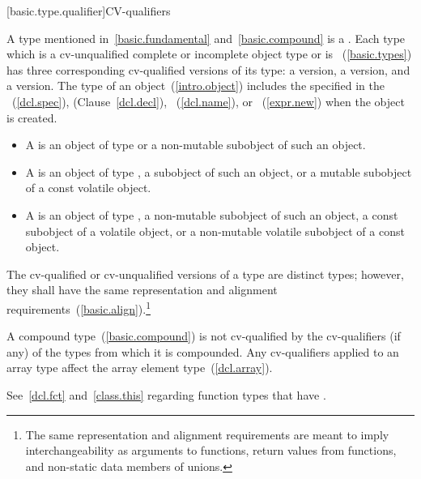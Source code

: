 [basic.type.qualifier]{CV-qualifiers}

\pnum
{}%
%
%
A type mentioned in~\ref{basic.fundamental} and~\ref{basic.compound} is
a . Each type which is a
cv-unqualified complete or incomplete object type or is
~(\ref{basic.types}) has three corresponding cv-qualified
versions of its type: a  version, a
 version, and a
 version. The
type of an object~(\ref{intro.object}) includes the 
specified in the ~(\ref{dcl.spec}),
 (Clause~\ref{dcl.decl}),
~(\ref{dcl.name}), or
~(\ref{expr.new}) when the object is created.
\begin{itemize}
\item A  is an object of type  or a
  non-mutable subobject of such an object.

\item A  is an object of type
  , a subobject of such an object, or a mutable
  subobject of a const volatile object.

\item A  is an object of type
  , a non-mutable subobject of such an object,
  a const subobject of a volatile object, or a non-mutable volatile
  subobject of a const object.
\end{itemize}
The cv-qualified or
cv-unqualified versions of a type
are distinct types; however, they shall have the same representation and
alignment requirements~(\ref{basic.align}).\footnote{The same representation
and alignment requirements are meant to imply
interchangeability as arguments to functions, return values from
functions, and non-static data members of unions.}

\pnum
{}%
A compound type~(\ref{basic.compound}) is not cv-qualified by the
cv-qualifiers (if any) of the types from which it is compounded. Any
cv-qualifiers applied to an array type
affect the array element type~(\ref{dcl.array}).

\pnum
See~\ref{dcl.fct} and~\ref{class.this} regarding function
types that have .

